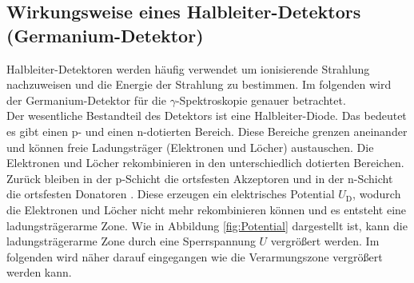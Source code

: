 \newpage
\subsection{Wirkungsweise eines Halbleiter-Detektors (Germanium-Detektor)}
Halbleiter-Detektoren werden häufig verwendet um ionisierende Strahlung nachzuweisen und die Energie der Strahlung zu bestimmen. Im folgenden wird der Germanium-Detektor für die $\gamma$-Spektroskopie genauer betrachtet. \\
Der wesentliche Bestandteil des Detektors ist eine Halbleiter-Diode. Das bedeutet es gibt einen p- und einen n-dotierten Bereich. Diese Bereiche grenzen aneinander und können freie Ladungsträger (Elektronen und Löcher) austauschen. Die Elektronen und Löcher rekombinieren in den unterschiedlich dotierten Bereichen. Zurück bleiben in der p-Schicht die ortsfesten Akzeptoren und in der n-Schicht die ortsfesten Donatoren \cite[10]{V18}. Diese erzeugen ein elektrisches Potential $U_\text{D}$, wodurch die Elektronen und Löcher nicht mehr rekombinieren können und es entsteht eine ladungsträgerarme Zone. Wie in Abbildung \eqref{fig:Potential} dargestellt ist, kann die ladungsträgerarme Zone durch eine Sperrspannung $U$ vergrößert werden. Im folgenden wird näher darauf eingegangen wie die Verarmungszone vergrößert werden kann.

